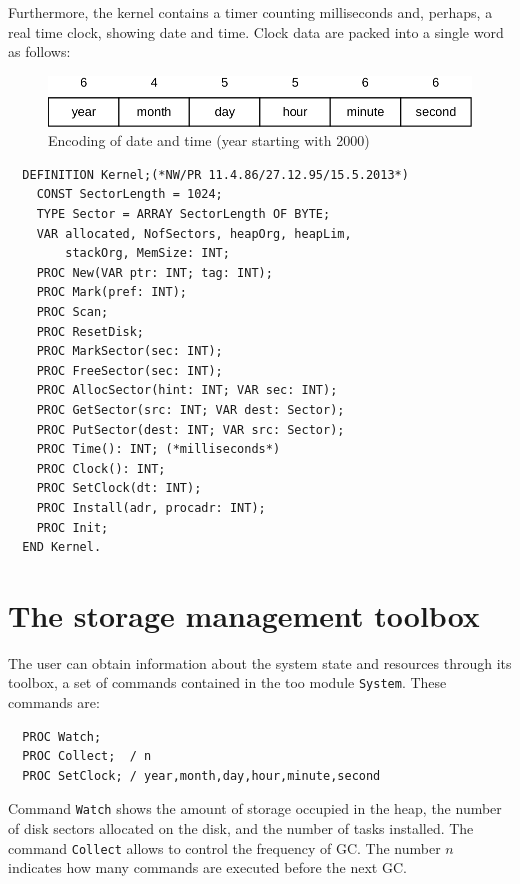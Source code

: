 Furthermore, the kernel contains a timer counting milliseconds and, perhaps, a real time
clock, showing date and time. Clock data are packed into a single word as follows:
\begin{figure}[h!]
  \centering
  \includegraphics[width=\textwidth]{i/y}
  \caption{Encoding of date and time (year starting with 2000)}
  \label{fig:datetime}
\end{figure}
\begin{verbatim}
  DEFINITION Kernel;(*NW/PR 11.4.86/27.12.95/15.5.2013*)
    CONST SectorLength = 1024;
    TYPE Sector = ARRAY SectorLength OF BYTE;
    VAR allocated, NofSectors, heapOrg, heapLim,
        stackOrg, MemSize: INT;
    PROC New(VAR ptr: INT; tag: INT);
    PROC Mark(pref: INT);
    PROC Scan;
    PROC ResetDisk;
    PROC MarkSector(sec: INT);
    PROC FreeSector(sec: INT);
    PROC AllocSector(hint: INT; VAR sec: INT);
    PROC GetSector(src: INT; VAR dest: Sector);
    PROC PutSector(dest: INT; VAR src: Sector);
    PROC Time(): INT; (*milliseconds*)
    PROC Clock(): INT;
    PROC SetClock(dt: INT);
    PROC Install(adr, procadr: INT);
    PROC Init;
  END Kernel.
\end{verbatim}

\section{The storage management toolbox}
The user can obtain information about the system state and resources through its toolbox,
a set of commands contained in the too module \verb|System|. These commands are:
\begin{verbatim}
  PROC Watch;
  PROC Collect;  / n
  PROC SetClock; / year,month,day,hour,minute,second
\end{verbatim}
Command \verb|Watch| shows the amount of storage occupied in the heap, the number of disk
sectors allocated on the disk, and the number of tasks installed. The command \verb|Collect|
allows to control the frequency of GC. The number $n$ indicates how many commands are
executed before the next GC.

